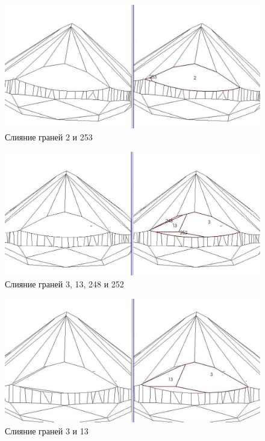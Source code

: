 \documentclass[a4paper,12pt, titlepage]{article}
\begin{document}
\begin{flushleft}
  \begin{figure}[p]
    \includegraphics[width=15cm]{polyhedron-2010-11-25/join4.jpeg}
    \caption{Слияние граней 2 и 253}\label{join4}
  \end{figure}
\end{flushleft}
\begin{flushleft}
  \begin{figure}[p]
    \includegraphics[width=15cm]{polyhedron-2010-11-25/join5.jpeg}
    \caption{Слияние граней 3, 13, 248 и 252}\label{join5}
  \end{figure}
\end{flushleft}
\begin{flushleft}
  \begin{figure}[p]
    \includegraphics[width=15cm]{polyhedron-2010-11-25/join6.jpeg}
    \caption{Слияние граней 3 и 13}\label{join6}
  \end{figure}
\end{flushleft}
\end{document}
